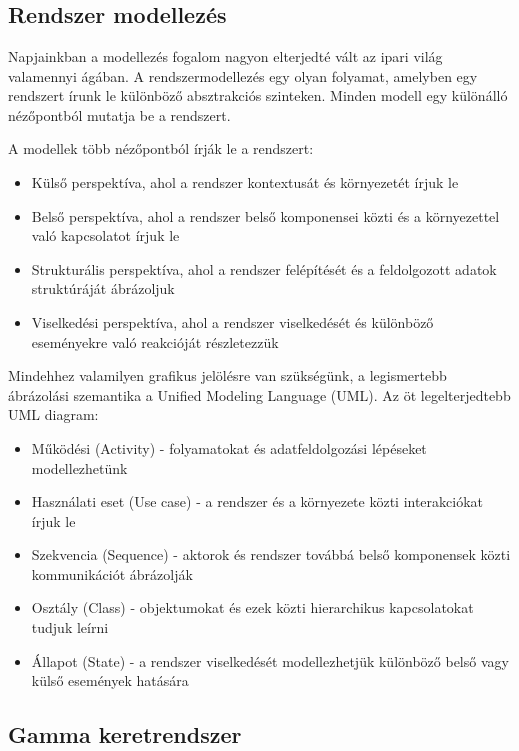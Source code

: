\chapter{\bevezetes}
\section{Rendszer modellezés}

Napjainkban a modellezés fogalom nagyon elterjedté vált az ipari világ valamennyi ágában. A rendszermodellezés egy olyan folyamat, amelyben egy rendszert írunk le különböző absztrakciós szinteken. Minden modell egy különálló nézőpontból mutatja be a rendszert.

A modellek több nézőpontból írják le a rendszert:
 \begin{itemize}
 	\item Külső perspektíva, ahol a rendszer kontextusát és környezetét írjuk le
 	\item Belső perspektíva, ahol a rendszer belső komponensei közti és a környezettel való kapcsolatot írjuk le
 	\item Strukturális perspektíva, ahol a rendszer felépítését és a feldolgozott adatok struktúráját ábrázoljuk
 	\item Viselkedési perspektíva, ahol a rendszer viselkedését és különböző eseményekre való reakcióját részletezzük
 \end{itemize}

Mindehhez valamilyen grafikus jelölésre van szükségünk, a legismertebb ábrázolási szemantika a Unified Modeling Language (UML). Az öt legelterjedtebb UML diagram:
 \begin{itemize}
	\item Működési (Activity) - folyamatokat és adatfeldolgozási lépéseket modellezhetünk
	\item Használati eset (Use case) - a rendszer és a környezete közti interakciókat írjuk le
	\item Szekvencia (Sequence) - aktorok és rendszer továbbá belső komponensek közti kommunikációt ábrázolják
	\item Osztály (Class) - objektumokat és ezek közti hierarchikus kapcsolatokat tudjuk leírni
	\item Állapot (State) - a rendszer viselkedését modellezhetjük különböző belső vagy külső események hatására
\end{itemize}

\section{Gamma keretrendszer}


